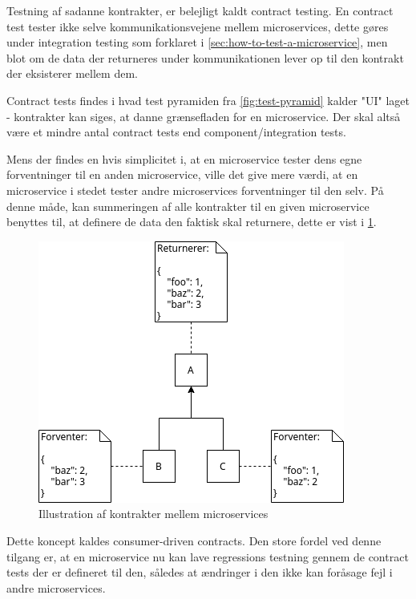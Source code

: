 \documentclass{article}
\begin{document}
Testning af sadanne kontrakter, er belejligt kaldt contract testing. En contract test tester ikke selve kommunikationsvejene mellem microservices, dette gøres under integration testing som forklaret i \ref{sec:how-to-test-a-microservice}, men blot om de data der returneres under kommunikationen lever op til den kontrakt der eksisterer mellem dem.

Contract tests findes i hvad test pyramiden fra \cref{fig:test-pyramid} kalder "UI" laget - kontrakter kan siges, at danne grænsefladen for en microservice. Der skal altså være et mindre antal contract tests end component/integration tests.

Mens der findes en hvis simplicitet i, at en microservice tester dens egne forventninger til en anden microservice, ville det give mere værdi, at en microservice i stedet tester andre microservices forventninger til den selv. På denne måde, kan summeringen af alle kontrakter til en given microservice benyttes til, at definere de data den faktisk skal returnere, dette er vist i \cref{fig:microservice-contracts}.

\begin{figure}[H]
    \includegraphics[width=\textwidth]{images/microservice-contracts.png}
    \caption{Illustration af kontrakter mellem microservices}
    \label{fig:microservice-contracts}
\end{figure}

Dette koncept kaldes consumer-driven contracts. Den store fordel ved denne tilgang er, at en microservice nu kan lave regressions testning gennem de contract tests der er defineret til den, således at ændringer i den ikke kan foråsage fejl i andre microservices.
\end{document}
